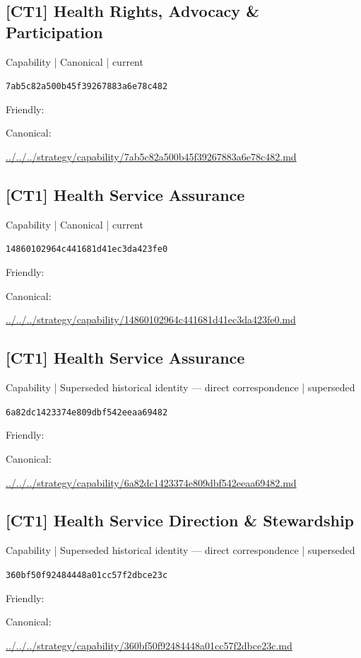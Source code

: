 \documentclass[10pt,a4paper]{article}
\begin{document}
\subsection*{[CT1] Health Rights, Advocacy \& Participation}
{\small Capability | Canonical | current}\par
\texttt{7ab5c82a500b45f39267883a6e78c482}\par
Friendly: \par
Canonical: \par
{\footnotesize\url{../../../strategy/capability/7ab5c82a500b45f39267883a6e78c482.md}}\par
\subsection*{[CT1] Health Service Assurance}
{\small Capability | Canonical | current}\par
\texttt{14860102964c441681d41ec3da423fe0}\par
Friendly: \par
Canonical: \par
{\footnotesize\url{../../../strategy/capability/14860102964c441681d41ec3da423fe0.md}}\par
\subsection*{[CT1] Health Service Assurance}
{\small Capability | Superseded historical identity — direct correspondence | superseded}\par
\texttt{6a82dc1423374e809dbf542eeaa69482}\par
Friendly: \par
Canonical: \par
{\footnotesize\url{../../../strategy/capability/6a82dc1423374e809dbf542eeaa69482.md}}\par
\subsection*{[CT1] Health Service Direction \& Stewardship}
{\small Capability | Superseded historical identity — direct correspondence | superseded}\par
\texttt{360bf50f92484448a01cc57f2dbce23c}\par
Friendly: \par
Canonical: \par
{\footnotesize\url{../../../strategy/capability/360bf50f92484448a01cc57f2dbce23c.md}}\par
\end{document}
